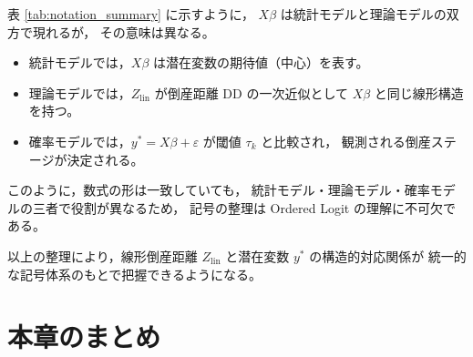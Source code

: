 \begin{table}[H]
\centering
\caption{潜在変数／倒産距離／閾値の記号整理}
\label{tab:notation_summary}
\end{table}

表 \ref{tab:notation_summary} に示すように，
$X\beta$ は統計モデルと理論モデルの双方で現れるが，
その意味は異なる。

\begin{itemize}
    \item 統計モデルでは，$X\beta$ は潜在変数の期待値（中心）を表す。
    \item 理論モデルでは，$Z_{\text{lin}}$ が倒産距離 DD の一次近似として
          $X\beta$ と同じ線形構造を持つ。
    \item 確率モデルでは，$y^* = X\beta + \varepsilon$ が閾値 $\tau_k$ と比較され，
          観測される倒産ステージが決定される。
\end{itemize}

このように，数式の形は一致していても，
統計モデル・理論モデル・確率モデルの三者で役割が異なるため，
記号の整理は Ordered Logit の理解に不可欠である。

以上の整理により，線形倒産距離 $Z_{\text{lin}}$ と潜在変数 $y^*$ の構造的対応関係が
統一的な記号体系のもとで把握できるようになる。


\section{本章のまとめ}
\label{sec:ordered_logit_summary}

